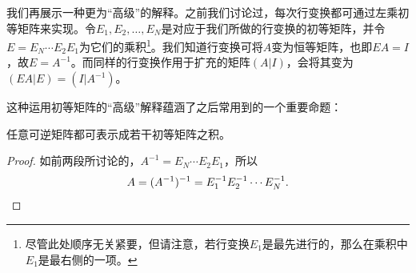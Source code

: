我们再展示一种更为“高级”的解释。之前我们讨论过，每次行变换都可通过左乘初等矩阵来实现。令$E_{1},E_{2},\ldots,E_{N}$是对应于我们所做的行变换的初等矩阵，并令$E=E_{N}\cdots E_{2}E_{1}$为它们的乘积\footnote{尽管此处顺序无关紧要，但请注意，若行变换$E_1$是最先进行的，那么在乘积中$E_1$是最右侧的一项。}。我们知道行变换可将$A$变为恒等矩阵，也即$EA=I$，故$E=A^{-1}$。而同样的行变换作用于扩充的矩阵$(A|I)$，会将其变为$(EA|E) = (I|A^{-1})$。{\hfill \qedsymbol}

这种运用初等矩阵的“高级”解释蕴涵了之后常用到的一个重要命题：

\begin{theorem}\label{thm:invert_elementary_prod}
  任意可逆矩阵都可表示成若干初等矩阵之积。
\end{theorem}

\begin{proof}
  如前两段所讨论的，$A^{-1}=E_{N}\cdots E_{2}E_{1}$，所以\[A=(A^{-1})^{-1}=E_{1}^{-1}E_{2}^{-1}\cdots E_{N}^{-1}.\qedhere\]
\end{proof}


